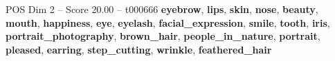 \begin{textsample}{POS Dim 2 – Score 20.00 – t000666}  \label{ex:f2_pos_026}
\textbf{eyebrow}, \textbf{lips}, \textbf{skin}, \textbf{nose}, \textbf{beauty}, \textbf{mouth}, \textbf{happiness}, \textbf{eye}, \textbf{eyelash}, \textbf{facial\_expression}, \textbf{smile}, \textbf{tooth}, \textbf{iris}, \textbf{portrait\_photography}, \textbf{brown\_hair}, \textbf{people\_in\_nature}, \textbf{portrait}, \textbf{pleased}, \textbf{earring}, \textbf{step\_cutting}, \textbf{wrinkle}, \textbf{feathered\_hair}

\end{textsample}
